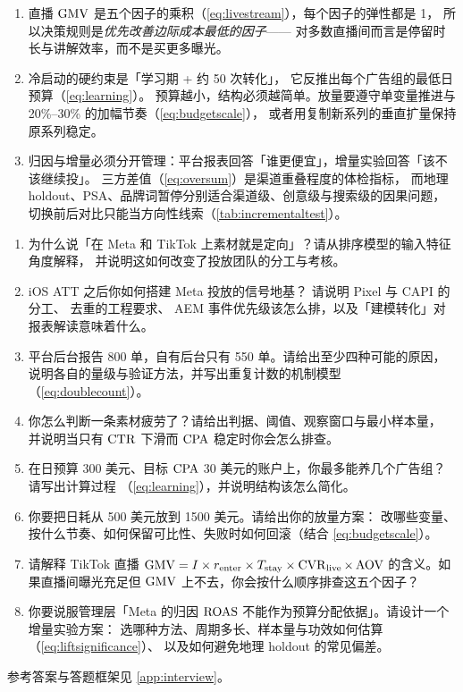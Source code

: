 \begin{keypoint}[本章要点回顾]
\begin{enumerate}
        达人矩阵要按层级错开 KPI：头部看声量与搜索溢出、腰部看 $\ROAS$、尾部看内容密度。
  \item 直播 $\operatorname{GMV}$ 是五个因子的乘积（\cref{eq:livestream}），每个因子的弹性都是 1，
        所以决策规则是\emph{优先改善边际成本最低的因子}——
        对多数直播间而言是停留时长与讲解效率，而不是买更多曝光。
  \item 冷启动的硬约束是「学习期 + 约 50 次转化」，
        它反推出每个广告组的最低日预算（\cref{eq:learning}）。
        预算越小，结构必须越简单。放量要遵守单变量推进与 20\%--30\% 的加幅节奏（\cref{eq:budgetscale}），
        或者用复制新系列的垂直扩量保持原系列稳定。
  \item 归因与增量必须分开管理：平台报表回答「谁更便宜」，增量实验回答「该不该继续投」。
        三方差值（\cref{eq:oversum}）是渠道重叠程度的体检指标，
        而地理 holdout、PSA、品牌词暂停分别适合渠道级、创意级与搜索级的因果问题，
        切换前后对比只能当方向性线索（\cref{tab:incrementaltest}）。
\end{enumerate}
\end{keypoint}

\begin{interview}[本章对应的面试题]
\begin{enumerate}
  \item 为什么说「在 Meta 和 TikTok 上素材就是定向」？请从排序模型的输入特征角度解释，
        并说明这如何改变了投放团队的分工与考核。
  \item iOS ATT 之后你如何搭建 Meta 投放的信号地基？
        请说明 Pixel 与 CAPI 的分工、 去重的工程要求、
        AEM 事件优先级该怎么排，以及「建模转化」对报表解读意味着什么。
  \item 平台后台报告 800 单，自有后台只有 550 单。请给出至少四种可能的原因，
        说明各自的量级与验证方法，并写出重复计数的机制模型（\cref{eq:doublecount}）。
  \item 你怎么判断一条素材疲劳了？请给出判据、阈值、观察窗口与最小样本量，
        并说明当只有 $\operatorname{CTR}$ 下滑而 $\operatorname{CPA}$ 稳定时你会怎么排查。
  \item 在日预算 300 美元、目标 $\operatorname{CPA}$ 30 美元的账户上，你最多能养几个广告组？请写出计算过程
        （\cref{eq:learning}），并说明结构该怎么简化。
  \item 你要把日耗从 500 美元放到 1500 美元。请给出你的放量方案：
        改哪些变量、按什么节奏、如何保留可比性、失败时如何回滚（结合 \cref{eq:budgetscale}）。
  \item 请解释 TikTok 直播 $\operatorname{GMV} = I \times r_{\text{enter}} \times T_{\text{stay}} \times \operatorname{CVR}_{\text{live}} \times \operatorname{AOV}$
        的含义。如果直播间曝光充足但 $\operatorname{GMV}$ 上不去，你会按什么顺序排查这五个因子？
  \item 你要说服管理层「Meta 的归因 $\ROAS$ 不能作为预算分配依据」。请设计一个增量实验方案：
        选哪种方法、周期多长、样本量与功效如何估算（\cref{eq:liftsignificance}）、
        以及如何避免地理 holdout 的常见偏差。
\end{enumerate}
参考答案与答题框架见 \cref{app:interview}。
\end{interview}

